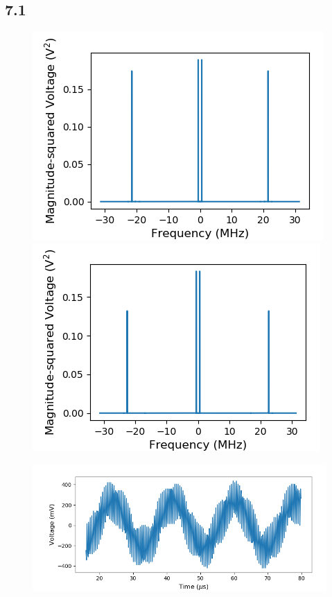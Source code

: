 \documentclass[a4paper]{article}
\begin{document}
\subsection{7.1}

\begin{figure}
\centering
\begin{minipage}{.5\textwidth}
	\centering
	\includegraphics[width=.8\linewidth]{7-1/l_power}
	\caption{}
	\label{fig:low_pow}
\end{minipage}%
\begin{minipage}{.5\textwidth}
	\centering
	\includegraphics[width=.8\linewidth]{7-1/h_power}
	\caption{}
	\label{fig:high_pow}
\end{minipage}
\end{figure}

\begin{figure}
\centering
\includegraphics[width=.45\linewidth]{7-1/low_osc}
\caption{}
\label{fig:low_display}
\end{figure}
\end{document}
